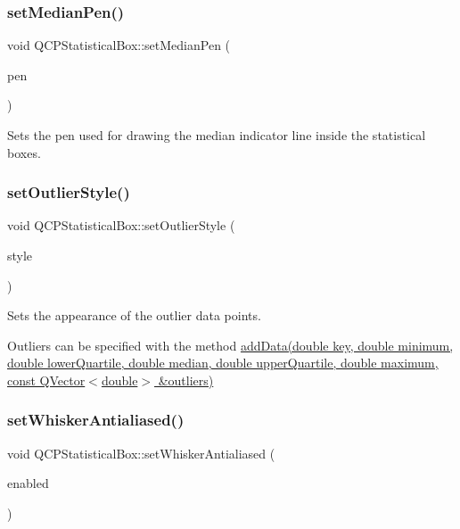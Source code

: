 \subsubsection{\texorpdfstring{set\+Median\+Pen()}{setMedianPen()}}
{\footnotesize\ttfamily void Q\+C\+P\+Statistical\+Box\+::set\+Median\+Pen (\begin{DoxyParamCaption}\item[{const Q\+Pen \&}]{pen }\end{DoxyParamCaption})}

Sets the pen used for drawing the median indicator line inside the statistical boxes. \mbox{\label{class_q_c_p_statistical_box_ad5241943422eb8e58360a97e99ad6aa7}} 
\subsubsection{\texorpdfstring{set\+Outlier\+Style()}{setOutlierStyle()}}
{\footnotesize\ttfamily void Q\+C\+P\+Statistical\+Box\+::set\+Outlier\+Style (\begin{DoxyParamCaption}\item[{const \hyperlink{class_q_c_p_scatter_style}{Q\+C\+P\+Scatter\+Style} \&}]{style }\end{DoxyParamCaption})}

Sets the appearance of the outlier data points.

Outliers can be specified with the method \hyperlink{class_q_c_p_statistical_box_a026f2790b530d6f29312254ecb1e7c1e}{add\+Data(double key, double minimum, double lower\+Quartile, double median, double upper\+Quartile, double maximum, const Q\+Vector$<$double$>$ \&outliers)} \mbox{\label{class_q_c_p_statistical_box_a61bcd458fba002f72304d11319051843}} 
\subsubsection{\texorpdfstring{set\+Whisker\+Antialiased()}{setWhiskerAntialiased()}}
{\footnotesize\ttfamily void Q\+C\+P\+Statistical\+Box\+::set\+Whisker\+Antialiased (\begin{DoxyParamCaption}\item[{bool}]{enabled }\end{DoxyParamCaption})}

